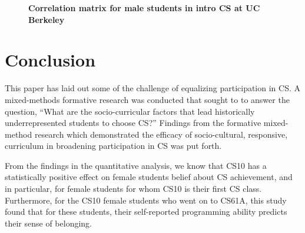 \documentclass[twoside,openright,titlepage,numbers=noenddot,headinclude,%
               footinclude=true,cleardoublepage=empty,abstractoff,BCOR=5mm,%
               paper=a4,fontsize=11pt,ngerman,american]{scrreprt}
\numberwithin{theorem}{chapter}
\numberwithin{definition}{chapter}
\numberwithin{algorithm}{chapter}
\numberwithin{figure}{chapter}
\numberwithin{table}{chapter}
\numberwithin{equation}{chapter}
\begin{document}
\begin{figure}[!htbp]
    \centering
%
\caption {\textbf{Correlation matrix for male students in intro CS at UC Berkeley}}
\label{fig:corrMale}
\end{figure}

 


\section*{Conclusion}

This paper has laid out some of the challenge of equalizing participation in CS. A mixed-methods formative research was conducted that sought to to answer the question, ``What are the socio-curricular factors that lead historically underrepresented students to choose CS?'' Findings from the formative mixed-method research which demonstrated the efficacy of socio-cultural, responsive, curriculum in broadening participation in CS was put forth. 


From the findings in the quantitative analysis, we know that CS10 has a statistically positive effect on female students belief about CS achievement, and in particular, for female students for whom CS10 is their first CS class. Furthermore, for the CS10 female students who went on to CS61A, this study found that for these students, their self-reported programming ability predicts their sense of belonging. 
\end{document}
